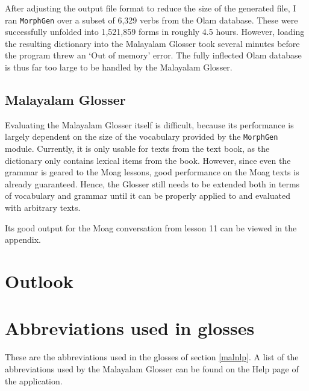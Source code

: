 \documentclass[a4paper]{article}
\newcommand{\typ}[1]{\texttt{#1}}
\begin{document}
After adjusting the output file format to reduce the size of the generated file, I ran \typ{MorphGen} over a subset of 6,329 verbs from the Olam database. These were successfully unfolded into 1,521,859 forms in roughly 4.5 hours. However, loading the resulting dictionary into the Malayalam Glosser took several minutes before the program threw an `Out of memory' error. The fully inflected Olam database is thus far too large to be handled by the Malayalam Glosser.

\subsection{Malayalam Glosser}

Evaluating the Malayalam Glosser itself is difficult, because its performance is largely dependent on the size of the vocabulary provided by the \typ{MorphGen} module. Currently, it is only usable for texts from the \textcite{moag} text book, as the dictionary only contains lexical items from the book. However, since even the grammar is geared to the Moag lessons, good performance on the Moag texts is already guaranteed. Hence, the Glosser still needs to be extended both in terms of vocabulary and grammar until it can be properly applied to and evaluated with arbitrary texts.

Its good output for the Moag conversation from lesson 11 can be viewed in the appendix.

\section{Outlook}



\printbibliography
\clearpage

\appendix

\section{Abbreviations used in glosses}

These are the abbreviations used in the glosses of section \ref{malnlp}. A list of the abbreviations used by the Malayalam Glosser can be found on the Help page of the application.
\end{document}
